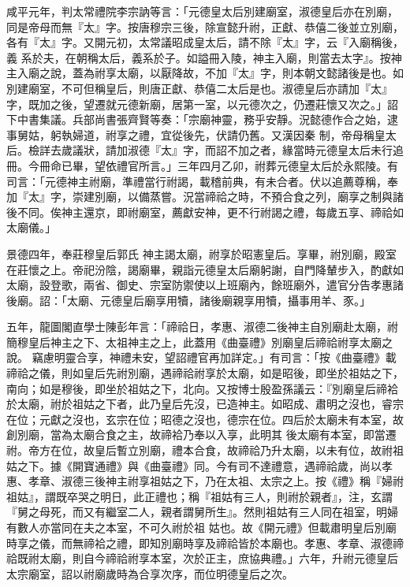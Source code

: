 \begin{pinyinscope}
 咸平元年，判太常禮院李宗訥等言：「元德皇太后別建廟室，淑德皇后亦在別廟，同是帝母而無『太』字。按唐穆宗三後，除宣懿升祔，正獻、恭僖二後並立別廟，各有『太』字。又開元初，太常議昭成皇太后，請不除『太』字，云『入廟稱後，義
 系於夫，在朝稱太后，義系於子。如謚冊入陵，神主入廟，則當去太字』。按神主入廟之說，蓋為祔享太廟，以厭降故，不加『太』字，則本朝文懿諸後是也。如別建廟室，不可但稱皇后，則唐正獻、恭僖二太后是也。淑德皇后亦請加『太』字，既加之後，望遷就元德新廟，居第一室，以元德次之，仍遷莊懷又次之。」詔下中書集議。兵部尚書張齊賢等奏：「宗廟神靈，務乎安靜。況懿德作合之始，逮事舅姑，躬執婦道，祔享之禮，宜從後先，伏請仍舊。又漢因秦
 制，帝母稱皇太后。檢詳去歲議狀，請加淑德『太』字，而詔不加之者，緣當時元德皇太后未行追冊。今冊命已畢，望依禮官所言。」三年四月乙卯，祔葬元德皇太后於永熙陵。有司言：「元德神主祔廟，準禮當行祔謁，載稽前典，有未合者。伏以追薦尊稱，奉加『太』字，崇建別廟，以備蒸嘗。況當禘祫之時，不預合食之列，廟享之制與諸後不同。俟神主還京，即祔廟室，薦獻安神，更不行祔謁之禮，每歲五享、禘祫如太廟儀。」



 景德四年，奉莊穆皇后郭氏
 神主謁太廟，祔享於昭憲皇后。享畢，祔別廟，殿室在莊懷之上。帝祀汾陰，謁廟畢，親詣元德皇太后廟躬謝，自門降輦步入，酌獻如太廟，設登歌，兩省、御史、宗室防禦使以上班廟內，餘班廟外，遣官分告孝惠諸後廟。詔：「太廟、元德皇后廟享用犢，諸後廟親享用犢，攝事用羊、豕。」



 五年，龍圖閣直學士陳彭年言：「禘祫日，孝惠、淑德二後神主自別廟赴太廟，祔簡穆皇后神主之下、太祖神主之上，此蓋用《曲臺禮》別廟皇后禘祫祔享太廟之說。
 竊慮明靈合享，神禮未安，望詔禮官再加詳定。」有司言：「按《曲臺禮》載禘祫之儀，則如皇后先祔別廟，遇禘祫祔享於太廟，如是昭後，即坐於祖姑之下，南向；如是穆後，即坐於祖姑之下，北向。又按博士殷盈孫議云：『別廟皇后禘袷於太廟，祔於祖姑之下者，此乃皇后先沒，已造神主。如昭成、肅明之沒也，睿宗在位；元獻之沒也，玄宗在位；昭德之沒也，德宗在位。四后於太廟未有本室，故創別廟，當為太廟合食之主，故禘袷乃奉以入享，此明其
 後太廟有本室，即當遷祔。帝方在位，故皇后暫立別廟，禮本合食，故禘祫乃升太廟，以未有位，故祔祖姑之下。據《開寶通禮》與《曲臺禮》同。今有司不達禮意，遇禘祫歲，尚以孝惠、孝章、淑德三後神主祔享祖姑之下，乃在太祖、太宗之上。按《禮》稱『婦祔祖姑』，謂既卒哭之明日，此正禮也；稱『祖姑有三人，則祔於親者』，注，玄謂『舅之母死，而又有繼室二人，親者謂舅所生』。然則祖姑有三人同在祖室，明婦有數人亦當同在夫之本室，不可久祔於祖
 姑也。故《開元禮》但載肅明皇后別廟時享之儀，而無禘袷之禮，即知別廟時享及禘祫皆於本廟也。孝惠、孝章、淑德禘祫既祔太廟，則自今禘祫祔享本室，次於正主，庶協典禮。」六年，升祔元德皇后太宗廟室，詔以祔廟歲時為合享次序，而位明德皇后之次。




\end{pinyinscope}

